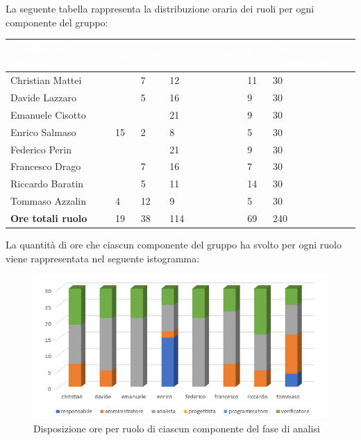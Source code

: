 La seguente tabella rappresenta la distribuzione oraria dei ruoli per ogni componente del gruppo:
\renewcommand{\arraystretch}{2}
\begin{table}[h!]
\centering
\caption{Tabella della divisione oraria di Analisi}	
\begin{longtable} { C{4cm} C{1cm} C{1cm} C{1cm} C{1cm} C{1cm} C{1cm} C{3cm}}

	\textcolor{white}{\textbf{Membro del gruppo}} & 
	\textcolor{white}{\textbf{RE}} & 
	\textcolor{white}{\textbf{AM}} & 
	\textcolor{white}{\textbf{AN}} & 
	\textcolor{white}{\textbf{PT}} & 
	\textcolor{white}{\textbf{PR}} & 
	\textcolor{white}{\textbf{VE}} & 
	\textcolor{white}{\textbf{Ore complessive}}\\	
\endhead        

        Christian Mattei     &  & 7 & 12 &  & & 11 & 30 \\
		Davide Lazzaro       &  & 5 & 16 &  &  & 9 & 30 \\
        Emanuele Cisotto     &  &  & 21 &  &  & 9 & 30 \\
        Enrico Salmaso       & 15 & 2 & 8  &  &  & 5 & 30 \\
        Federico Perin       &  &  & 21 &  &  & 9 & 30 \\
        Francesco Drago      &  & 7 & 16 &  &  & 7 & 30 \\
        Riccardo Baratin     &  & 5 & 11 &  &  & 14 & 30 \\
        Tommaso Azzalin      & 4 & 12 & 9  &  &  & 5 & 30 \\
        \textbf{Ore totali ruolo} & 19 & 38 & 114 &  &  & 69 & 240 \\
        
\end{longtable}
\end{table}
\newline
La quantità di ore che ciascun componente del gruppo ha svolto per ogni ruolo viene rappresentata nel seguente istogramma:
\begin{figure}[h]
	\centering
	\caption{Disposizione ore per ruolo di ciascun componente del fase di analisi}
	\includegraphics[scale=2]{sezioni/Istogrammi/IstogrammaAnalisi.png}
	
\end{figure}


